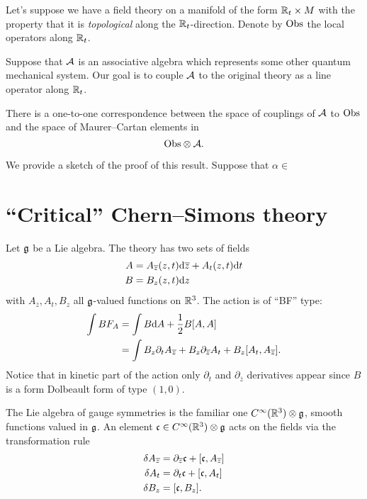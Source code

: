 \documentclass[11pt]{amsart}
\def\zbar{{\overline{z}}}
\begin{document}
Let's suppose we have a field theory on a manifold of the form $\mathbb R_t \times M$ with the property that it is {\em topological} along the $\mathbb R_t$-direction. 
Denote by ${\rm Obs}$ the local operators along $\mathbb R_t$. 

Suppose that $\mathcal A$ is an associative algebra which represents some other quantum mechanical system. 
Our goal is to couple $\mathcal A$ to the original theory as a line operator along $\mathbb R_t$. 

\begin{prop}
There is a one-to-one correspondence between the space of couplings of $\mathcal A$ to ${\rm Obs}$ and the space of Maurer--Cartan elements in 
\[
{\rm Obs} \otimes \mathcal A .
\]
\end{prop}

We provide a sketch of the proof of this result. 
Suppose that $\alpha \in $


\section{``Critical'' Chern--Simons theory}

Let $\mathfrak g$ be a Lie algebra. 
The theory has two sets of fields
\begin{align*}
A & = A_{\zbar} (z,t) \d \zbar + A_{t} (z, t) \d t \\
B & = B_z (z,t) \d z 
\end{align*}
with $A_{\zbar}, A_t, B_z$ all $\mathfrak g$-valued functions on $\mathbb R^3$.
The action is of ``BF'' type:
\begin{align*}
\int B F_A & = \int B \d A + \frac12 B [A,A] \\
& = \int B_z \partial_t A_{\zbar} + B_z \partial_{\zbar} A_t + B_z [A_t, A_\zbar] .
\end{align*}
Notice that in kinetic part of the action only $\partial_t$ and $\partial_{\zbar}$ derivatives appear since $B$ is a form Dolbeault form of type $(1,0)$. 

The Lie algebra of gauge symmetries is the familiar one $C^\infty(\mathbb R^3) \otimes \mathfrak g$, smooth functions valued in $\mathfrak g$. 
An element $\mathfrak c \in C^\infty(\mathbb R^3) \otimes \mathfrak g$ acts on the fields via the transformation rule
\begin{align*}
\delta A_\zbar & = \partial_{\zbar} \fc + [\fc, A_\zbar] \\
\delta A_t & = \partial_t \fc + [\fc,A_t] \\
\delta B_z & = [\fc, B_z] .
\end{align*}
\end{document}
